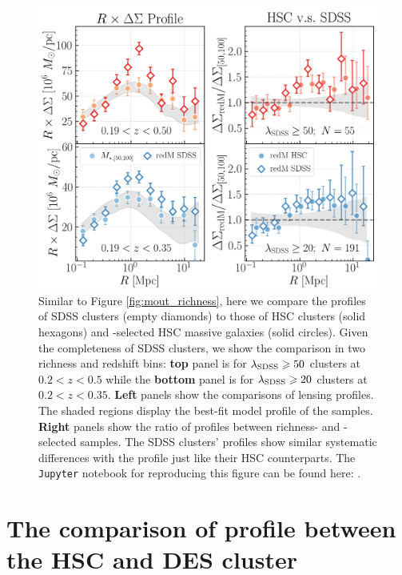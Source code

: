 \documentclass[fleqn,usenatbib,useAMS]{mnras}
\begin{document}
\begin{CJK*}{UTF8}{gbsn}
\begin{figure}
    \centering
    \includegraphics[width=\columnwidth]{figure/fig_F1}
    \caption{
        Similar to Figure \ref{fig:mout_richness}, here we compare the \dsigma{} profiles of
        SDSS \redm{} clusters (empty diamonds) to those of HSC \redm{} clusters (solid hexagons)
        and -selected HSC massive galaxies (solid circles). 
        Given the completeness of SDSS \redm{} clusters, we show the comparison in two richness
        and redshift bins: \textbf{top} panel is for $\lambda_{\rm SDSS} \geq 50$ clusters at
        $0.2 < z < 0.5$ while the \textbf{bottom} panel is for $\lambda_{\rm SDSS} \geq 20$
        clusters at $0.2 < z < 0.35$.
        \textbf{Left} panels show the comparisons of lensing profiles. 
        The shaded regions display the best-fit model profile of the  samples.
        \textbf{Right} panels show the ratio of \dsigma{} profiles between richness- and 
        -selected samples.
        The SDSS \redm{} clusters' \dsigma{} profiles show similar systematic differences 
        with the  profile just like their HSC counterparts.
        The \texttt{Jupyter} notebook for reproducing this figure can be found here:
        \href{https://github.com/dr-guangtou/jianbing/blob/master/notebooks/figure/figF1.ipynb}{\faGithub}.
    }
    \label{fig:sdss_redm}
\end{figure}

\section{The comparison of \texorpdfstring{\dsigma{}}{DSigma} profile between the HSC and DES \texorpdfstring{\redm{}}{redMaPPer} cluster}
	\label{app:des_redm}
	

\end{CJK*}
\end{document}
